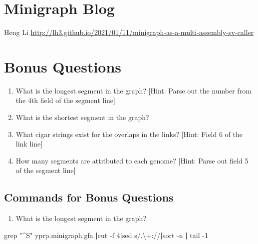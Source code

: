 \documentclass[
]{book}
\newenvironment{Shaded}{\begin{snugshade}}{\end{snugshade}}
\newcommand{\AttributeTok}[1]{\textcolor[rgb]{0.77,0.63,0.00}{#1}}
\newcommand{\FunctionTok}[1]{\textcolor[rgb]{0.00,0.00,0.00}{#1}}
\newcommand{\KeywordTok}[1]{\textcolor[rgb]{0.13,0.29,0.53}{\textbf{#1}}}
\newcommand{\NormalTok}[1]{#1}
\newcommand{\StringTok}[1]{\textcolor[rgb]{0.31,0.60,0.02}{#1}}
\providecommand{\tightlist}{%
  \setlength{\itemsep}{0pt}\setlength{\parskip}{0pt}}
\begin{document}
\hypertarget{minigraph-blog}{%
\section{Minigraph Blog}\label{minigraph-blog}}

Heng Li
\url{http://lh3.github.io/2021/01/11/minigraph-as-a-multi-assembly-sv-caller}

\hypertarget{bonus-questions}{%
\section{Bonus Questions}\label{bonus-questions}}

\begin{enumerate}
\def\labelenumi{\arabic{enumi}.}
\tightlist
\item
  What is the longest segment in the graph?
  {[}Hint: Parse out the number from the 4th field of the segment line{]}
\item
  What is the shortest segment in the graph?
\item
  What cigar strings exist for the overlaps in the links? {[}Hint:
  Field 6 of the link line{]}
\item
  How many segments are attributed to each genome? {[}Hint: Parse out field 5 of the segment line{]}
\end{enumerate}

\hypertarget{commands-for-bonus-questions}{%
\subsection*{Commands for Bonus Questions}\label{commands-for-bonus-questions}}

\begin{enumerate}
\def\labelenumi{\arabic{enumi}.}
\tightlist
\item
  What is the longest segment in the graph?
\end{enumerate}

\begin{Shaded}
\begin{Highlighting}[]
\FunctionTok{grep} \StringTok{"\^{}S"}\NormalTok{ yprp.minigraph.gfa }\KeywordTok{|}\FunctionTok{cut} \AttributeTok{{-}f}\NormalTok{ 4}\KeywordTok{|}\FunctionTok{sed} \StringTok{\textquotesingle{}s/.\textbackslash{}+://\textquotesingle{}}\KeywordTok{|}\FunctionTok{sort} \AttributeTok{{-}n} \KeywordTok{|} \FunctionTok{tail} \AttributeTok{{-}1}
\end{Highlighting}
\end{Shaded}
\end{document}
